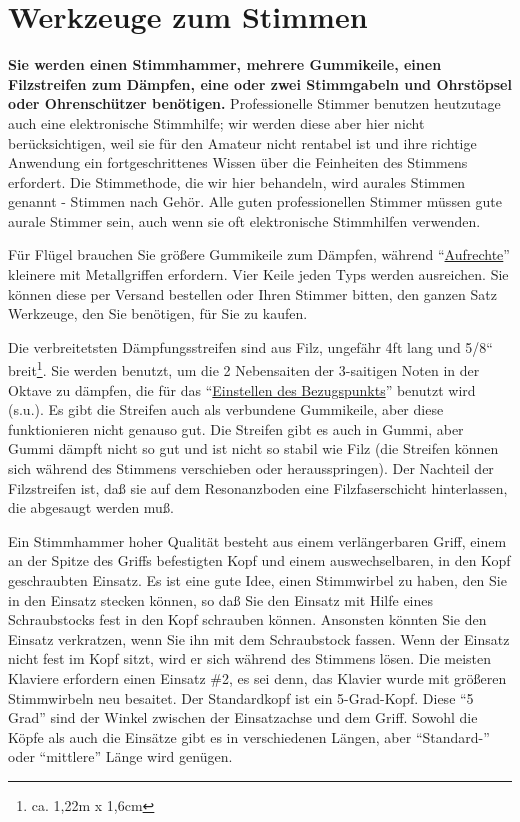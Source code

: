 
\chapter{Werkzeuge zum Stimmen}\hypertarget{c2_3}{}

\textbf{Sie werden einen Stimmhammer, mehrere Gummikeile, einen Filzstreifen zum Dämpfen, eine oder zwei Stimmgabeln und Ohrstöpsel oder Ohrenschützer benötigen.}
Professionelle Stimmer benutzen heutzutage auch eine elektronische Stimmhilfe; wir werden diese aber hier nicht berücksichtigen, weil sie für den Amateur nicht rentabel ist und ihre richtige Anwendung ein fortgeschrittenes Wissen über die Feinheiten des Stimmens erfordert.
Die Stimmethode, die wir hier behandeln, wird aurales Stimmen genannt - Stimmen nach Gehör.
Alle guten professionellen Stimmer müssen gute aurale Stimmer sein, auch wenn sie oft elektronische Stimmhilfen verwenden.

Für Flügel brauchen Sie größere Gummikeile zum Dämpfen, während \enquote{\hyperlink{upright}{Aufrechte}} kleinere mit Metallgriffen erfordern.
Vier Keile jeden Typs werden ausreichen.
Sie können diese per Versand bestellen oder Ihren Stimmer bitten, den ganzen Satz Werkzeuge, den Sie benötigen, für Sie zu kaufen.

Die verbreitetsten Dämpfungsstreifen sind aus Filz, ungefähr 4ft lang und 5/8`` breit\footnote{ca. 1,22m x 1,6cm}.
Sie werden benutzt, um die 2 Nebensaiten der 3-saitigen Noten in der Oktave zu dämpfen, die für das \enquote{\hyperlink{c2_4}{Einstellen des Bezugspunkts}} benutzt wird (s.u.).
Es gibt die Streifen auch als verbundene Gummikeile, aber diese funktionieren nicht genauso gut.
Die Streifen gibt es auch in Gummi, aber Gummi dämpft nicht so gut und ist nicht so stabil wie Filz (die Streifen können sich während des Stimmens verschieben oder herausspringen).
Der Nachteil der Filzstreifen ist, daß sie auf dem Resonanzboden eine Filzfaserschicht hinterlassen, die abgesaugt werden muß.

Ein Stimmhammer hoher Qualität besteht aus einem verlängerbaren Griff, einem an der Spitze des Griffs befestigten Kopf und einem auswechselbaren, in den Kopf geschraubten Einsatz.
Es ist eine gute Idee, einen Stimmwirbel zu haben, den Sie in den Einsatz stecken können, so daß Sie den Einsatz mit Hilfe eines Schraubstocks fest in den Kopf schrauben können.
Ansonsten könnten Sie den Einsatz verkratzen, wenn Sie ihn mit dem Schraubstock fassen.
Wenn der Einsatz nicht fest im Kopf sitzt, wird er sich während des Stimmens lösen.
Die meisten Klaviere erfordern einen Einsatz \#2, es sei denn, das Klavier wurde mit größeren Stimmwirbeln neu besaitet.
Der Standardkopf ist ein 5-Grad-Kopf.
Diese \enquote{5 Grad} sind der Winkel zwischen der Einsatzachse und dem Griff.
Sowohl die Köpfe als auch die Einsätze gibt es in verschiedenen Längen, aber \enquote{Standard-} oder \enquote{mittlere} Länge wird genügen.
 

